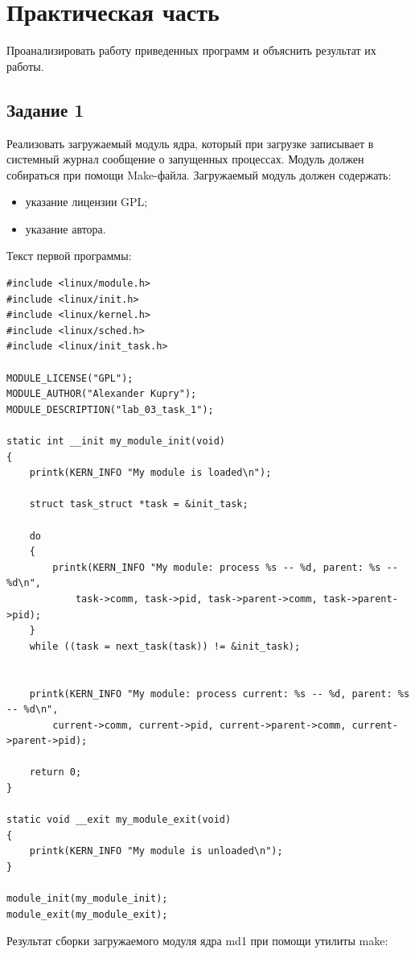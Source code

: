 \chapter{Практическая часть}

Проанализировать работу приведенных программ и объяснить результат их работы.

\section{Задание \No{}1}
Реализовать загружаемый модуль ядра, который при загрузке записывает в системный журнал сообщение о запущенных процессах. Модуль должен собираться при помощи Make-файла.
Загружаемый модуль должен содержать:
\begin{itemize}
\item указание лицензии GPL;
\item указание автора.
\end{itemize}
Текст первой программы:

\lstset{language=c}
\begin{lstlisting}[caption=Текст программы первого задания]
#include <linux/module.h>
#include <linux/init.h>
#include <linux/kernel.h>
#include <linux/sched.h>
#include <linux/init_task.h>

MODULE_LICENSE("GPL");
MODULE_AUTHOR("Alexander Kupry");
MODULE_DESCRIPTION("lab_03_task_1");

static int __init my_module_init(void)
{
    printk(KERN_INFO "My module is loaded\n");

    struct task_struct *task = &init_task;

    do
    {
        printk(KERN_INFO "My module: process %s -- %d, parent: %s -- %d\n",
            task->comm, task->pid, task->parent->comm, task->parent->pid);
    }
    while ((task = next_task(task)) != &init_task);


    printk(KERN_INFO "My module: process current: %s -- %d, parent: %s -- %d\n",
        current->comm, current->pid, current->parent->comm, current->parent->pid);

    return 0;
}

static void __exit my_module_exit(void)
{
    printk(KERN_INFO "My module is unloaded\n");
}

module_init(my_module_init);
module_exit(my_module_exit);
\end{lstlisting}

Результат сборки загружаемого модуля ядра md1 при помощи утилиты make:

